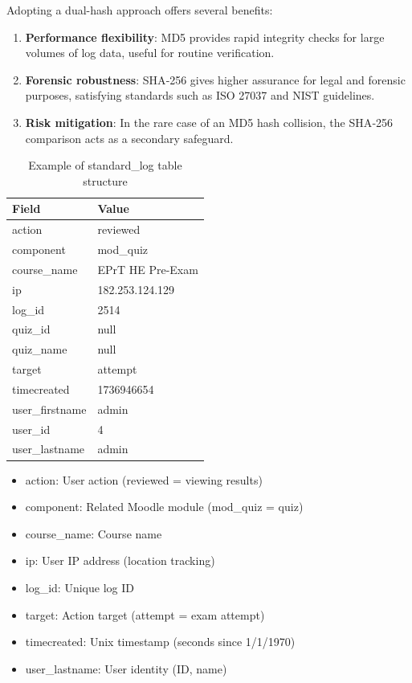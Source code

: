 Adopting a dual-hash approach offers several benefits:
\begin{enumerate}
	\item \textbf{Performance flexibility}: MD5 provides rapid integrity checks for large volumes of log data, useful for routine verification.
	\item \textbf{Forensic robustness}: SHA‑256 gives higher assurance for legal and forensic purposes, satisfying standards such as ISO 27037 and NIST guidelines.
	\item \textbf{Risk mitigation}: In the rare case of an MD5 hash collision, the SHA‑256 comparison acts as a secondary safeguard.
\end{enumerate}

\begin{table}[H]
	\centering
	\caption{Example of standard\_log table structure}
	\label{tab:json_log_example}
	\begin{tabular}{|l|l|}
		\hline
		\textbf{Field} & \textbf{Value} \\ \hline
		action & reviewed \\ \hline
		component & mod\_quiz \\ \hline
		course\_name & EPrT HE Pre-Exam \\ \hline
		ip & 182.253.124.129 \\ \hline
		log\_id & 2514 \\ \hline
		quiz\_id & null \\ \hline
		quiz\_name & null \\ \hline
		target & attempt \\ \hline
		timecreated & 1736946654 \\ \hline
		user\_firstname & admin \\ \hline
		user\_id & 4 \\ \hline
		user\_lastname & admin \\ \hline
	\end{tabular}
\end{table}

\begin{itemize}
	\item action: User action (reviewed = viewing results)
	\item component: Related Moodle module (mod\_quiz = quiz)
	\item course\_name: Course name
	\item ip: User IP address (location tracking)
	\item log\_id: Unique log ID
	\item target: Action target (attempt = exam attempt)
	\item timecreated: Unix timestamp (seconds since 1/1/1970)
	\item user\_lastname: User identity (ID, name)
\end{itemize}

